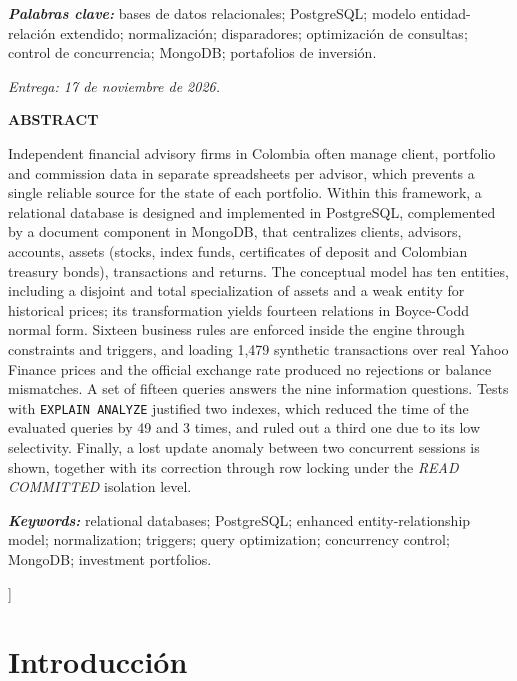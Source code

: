 \documentclass[10pt,letterpaper]{article}
\renewcommand{\_}{\oldUS\allowbreak}
\begin{document}
{{\par\vspace{4pt}
\textbf{\textit{Palabras clave:}} bases de datos relacionales; PostgreSQL; modelo entidad-relación extendido; normalización; disparadores; optimización de consultas; control de concurrencia; MongoDB; portafolios de inversión.
\par\vspace{2pt}
\textit{Entrega: 17 de noviembre de 2026.}
}
\begin{center}{\small\bfseries ABSTRACT}\end{center}
\vspace{-4pt}
{\small
Independent financial advisory firms in Colombia often manage client, portfolio and commission data in separate spreadsheets per advisor, which prevents a single reliable source for the state of each portfolio. Within this framework, a relational database is designed and implemented in PostgreSQL, complemented by a document component in MongoDB, that centralizes clients, advisors, accounts, assets (stocks, index funds, certificates of deposit and Colombian treasury bonds), transactions and returns. The conceptual model has ten entities, including a disjoint and total specialization of assets and a weak entity for historical prices; its transformation yields fourteen relations in Boyce-Codd normal form. Sixteen business rules are enforced inside the engine through constraints and triggers, and loading 1,479 synthetic transactions over real Yahoo Finance prices and the official exchange rate produced no rejections or balance mismatches. A set of fifteen queries answers the nine information questions. Tests with \texttt{EXPLAIN ANALYZE} justified two indexes, which reduced the time of the evaluated queries by 49 and 3 times, and ruled out a third one due to its low selectivity. Finally, a lost update anomaly between two concurrent sessions is shown, together with its correction through row locking under the \textit{READ COMMITTED} isolation level.
\par\vspace{4pt}
\textbf{\textit{Keywords:}} relational databases; PostgreSQL; enhanced entity-relationship model; normalization; triggers; query optimization; concurrency control; MongoDB; investment portfolios.
}
\vspace{10pt}
}]

\section{Introducción}
\end{document}
